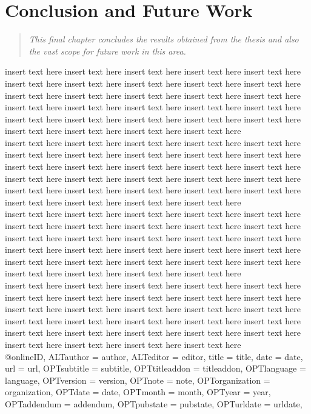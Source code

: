 \chapter{Conclusion and Future Work}
\begin{quote} 
\it This final chapter concludes the results obtained from the thesis and also the vast scope for future work in this area.
\end{quote}

insert text here insert text here insert text here insert text here insert text here
insert text here insert text here insert text here insert text here insert text here insert text here insert text here insert text here insert text here insert text here insert text here insert text here insert text here insert text here insert text here insert text here insert text here insert text here insert text here insert text here insert text here insert text here insert text here insert text here   \\

insert text here insert text here insert text here insert text here insert text here
insert text here insert text here insert text here insert text here insert text here insert text here insert text here insert text here insert text here insert text here insert text here insert text here insert text here insert text here insert text here insert text here insert text here insert text here insert text here insert text here insert text here insert text here insert text here insert text here   \\

insert text here insert text here insert text here insert text here insert text here
insert text here insert text here insert text here insert text here insert text here insert text here insert text here insert text here insert text here insert text here insert text here insert text here insert text here insert text here insert text here insert text here insert text here insert text here insert text here insert text here insert text here insert text here insert text here insert text here   \\

insert text here insert text here insert text here insert text here insert text here
insert text here insert text here insert text here insert text here insert text here insert text here insert text here insert text here insert text here insert text here insert text here insert text here insert text here insert text here insert text here insert text here insert text here insert text here insert text here insert text here insert text here insert text here insert text here insert text here   \\


@online{ID,
ALTauthor = {author},
ALTeditor = {editor},
title = {title},
date = {date},
url = {url},
OPTsubtitle = {subtitle},
OPTtitleaddon = {titleaddon},
OPTlanguage = {language},
OPTversion = {version},
OPTnote = {note},
OPTorganization = {organization},
OPTdate = {date},
OPTmonth = {month},
OPTyear = {year},
OPTaddendum = {addendum},
OPTpubstate = {pubstate},
OPTurldate = {urldate},
}

